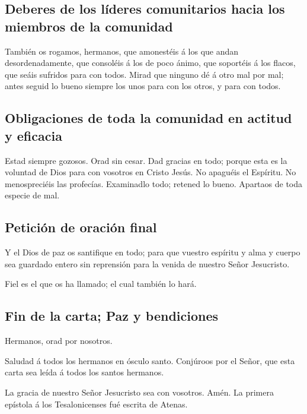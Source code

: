 \hypertarget{deberes-de-los-luxedderes-comunitarios-hacia-los-miembros-de-la-comunidad}{%
\subsection{Deberes de los líderes comunitarios hacia los miembros de la
comunidad}\label{deberes-de-los-luxedderes-comunitarios-hacia-los-miembros-de-la-comunidad}}

 También os rogamos, hermanos, que amonestéis á los que
andan desordenadamente, que consoléis á los de poco ánimo, que soportéis
á los flacos, que seáis sufridos para con todos.  Mirad
que ninguno dé á otro mal por mal; antes seguid lo bueno siempre los
unos para con los otros, y para con todos.

\hypertarget{obligaciones-de-toda-la-comunidad-en-actitud-y-eficacia}{%
\subsection{Obligaciones de toda la comunidad en actitud y
eficacia}\label{obligaciones-de-toda-la-comunidad-en-actitud-y-eficacia}}

 Estad siempre gozosos.  Orad sin cesar.
 Dad gracias en todo; porque esta es la voluntad de Dios
para con vosotros en Cristo Jesús.  No apaguéis el
Espíritu.  No menospreciéis las profecías.
 Examinadlo todo; retened lo bueno. 
Apartaos de toda especie de mal.

\hypertarget{peticiuxf3n-de-oraciuxf3n-final}{%
\subsection{Petición de oración
final}\label{peticiuxf3n-de-oraciuxf3n-final}}

 Y el Dios de paz os santifique en todo; para que vuestro
espíritu y alma y cuerpo sea guardado entero sin reprensión para la
venida de nuestro Señor Jesucristo.

 Fiel es el que os ha llamado; el cual también lo hará.

\hypertarget{fin-de-la-carta-paz-y-bendiciones}{%
\subsection{Fin de la carta; Paz y
bendiciones}\label{fin-de-la-carta-paz-y-bendiciones}}

 Hermanos, orad por nosotros.

 Saludad á todos los hermanos en ósculo santo.
 Conjúroos por el Señor, que esta carta sea leída á todos
los santos hermanos.

 La gracia de nuestro Señor Jesucristo sea con vosotros.
Amén. La primera epístola á los Tesalonicenses fué escrita de Atenas.
